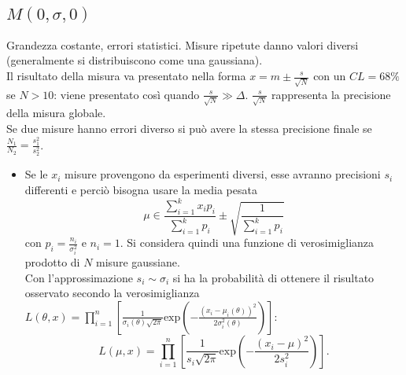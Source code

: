 \subsection{$M\left( 0,\sigma,0 \right) $} %
\label{subsec:0s0}
Grandezza costante, errori statistici. Misure ripetute danno valori diversi (generalmente si distribuiscono come una gaussiana).
\\ Il risultato della misura va presentato nella forma $x=m\pm \frac{s}{\sqrt{N}}$ con un $CL=68\%$ se $N>10$: viene presentato così quando $\frac{s}{\sqrt{N}} \gg \Delta$. $\frac{s}{\sqrt{N}}$ rappresenta la precisione della misura globale.
\\ Se due misure hanno errori diverso si può avere la stessa precisione finale se $\frac{N_1}{N_2}=\frac{s_1^2}{s_2^2}$.
\begin{itemize}
\item Se le $x_i$ misure provengono da esperimenti diversi, esse avranno precisioni $s_i$ differenti e perciò bisogna usare la media pesata
\begin{equation}
\mu \in \frac { \sum _{ i=1 }^{ k }{ { x }_{ i }{ p }_{ i } }  }{ \sum _{ i=1 }^{ k }{ { p }_{ i } }  } \pm \sqrt { \frac { 1 }{ \sum _{ i=1 }^{ k }{ { p }_{ i } }  }  }
\end{equation}
con ${ p }_{ i }=\frac { { n }_{ i } }{ { \sigma  }_{ i }^{ 2 } } $ e $n_i=1$. Si considera quindi una funzione di verosimiglianza prodotto di $N$ misure gaussiane.
\\ Con l'approssimazione $s_i\sim \sigma_i$ si ha la probabilità di ottenere il risultato osservato secondo la verosimiglianza $L\left( \theta ,x \right) =\prod _{ i=1 }^{ n }{ \left[ \frac { 1 }{ { \sigma  }_{ i }\left( \theta  \right) \sqrt { 2\pi  }  } \textrm{exp}\left( -\frac { { \left( { x }_{ i }-{ \mu  }_{ i }\left( \theta  \right)  \right)  }^{ 2 } }{ 2{ \sigma  }_{ i }^{ 2 }\left( \theta  \right)  }  \right)  \right]  } $:
\begin{equation}
L\left( \mu ,x \right) =\prod _{ i=1 }^{ n }{ \left[ \frac { 1 }{ { s }_{ i }\sqrt { 2\pi  }  } \textrm{exp}\left( -\frac { { \left( { x }_{ i }-{ \mu  } \right)  }^{ 2 } }{ 2{ s }_{ i }^{ 2 } }  \right)  \right]  } .
\end{equation}
\end{itemize}

